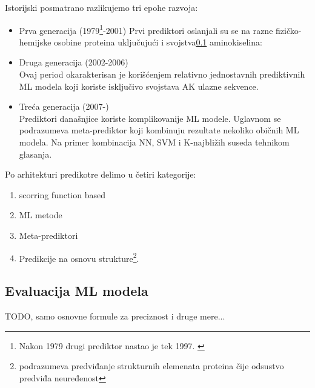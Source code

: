 Istorijski posmatrano razlikujemo tri epohe razvoja: \parencite{meng_c2017}
\begin{itemize}
  \item Prva generacija (1979\footnote{
      Nakon 1979 drugi prediktor nastao je tek 1997. \parencite{meng_c2017}
    }-2001)
    Prvi prediktori oslanjali su se na razne fizičko-hemijske osobine proteina
    uključujući i svojstva\ref{} aminokiselina: 

  \item Druga generacija (2002-2006)\\
    Ovaj period okarakterisan je korišćenjem relativno jednostavnih
    prediktivnih ML modela koji koriste isključivo svojstava AK ulazne
    sekvence.

  \item Treća generacija (2007-)\\
    Prediktori današnjice koriste komplikovanije ML modele. Uglavnom  se
    podrazumeva meta-prediktor koji kombinuju rezultate nekoliko običnih ML
    modela. Na primer kombinacija NN, SVM i K-najbližih suseda tehnikom
    glasanja.

\end{itemize}


Po arhitekturi predikotre delimo u četiri kategorije: \parencite{meng_c2017}
\begin{enumerate}
  \item
    scorring function based

  \item
    ML metode 

  \item
    Meta-prediktori

  \item
    Predikcije na osnovu strukture\footnote{podrazumeva predviđanje strukturnih
    elemenata proteina čije odsustvo predviđa neuređenost}.
\end{enumerate}


\subsection{Evaluacija ML modela}
TODO, samo osnovne formule za preciznost i druge mere...


